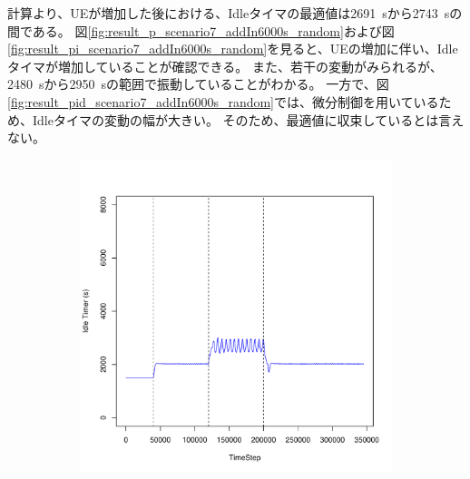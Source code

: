 \documentclass[a4j]{ujarticle}
\begin{document}
計算より、UEが増加した後における、Idleタイマの最適値は2691~sから2743~sの間である。
図\ref{fig:result_p_scenario7_addIn6000s_random}および図\ref{fig:result_pi_scenario7_addIn6000s_random}を見ると、UEの増加に伴い、Idleタイマが増加していることが確認できる。
また、若干の変動がみられるが、2480~sから2950~sの範囲で振動していることがわかる。
一方で、図\ref{fig:result_pid_scenario7_addIn6000s_random}では、微分制御を用いているため、Idleタイマの変動の幅が大きい。
そのため、最適値に収束しているとは言えない。
\begin{figure}[htbp]
 \centering
 \begin{subfigure}{0.49\hsize}
   \centering
   \includegraphics[width=1.0\hsize]{scenario_7_idleTimer_0_691200_1-5_0_0_0_addIn6000s_random.pdf}
   \label{subfig:scenario_7_idleTimer_0_691200_1-5_0_0_0_addIn6000s_random}
 \end{subfigure}
 \par\bigskip %
 \begin{subfigure}{0.49\hsize}

\end{subfigure}
\end{figure}
\end{document}
